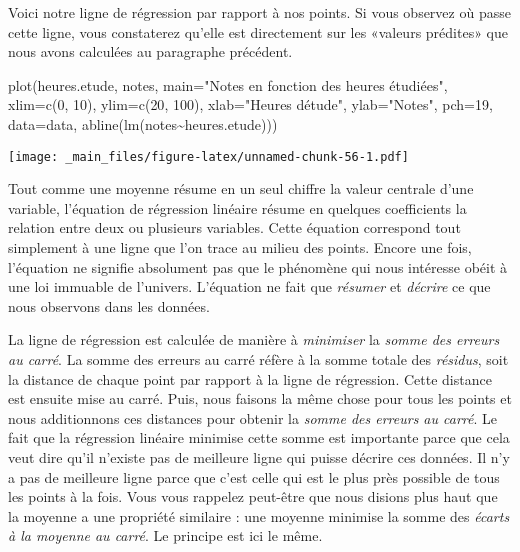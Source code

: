 \documentclass[
]{book}
\newenvironment{Shaded}{\begin{snugshade}}{\end{snugshade}}
\newcommand{\AttributeTok}[1]{\textcolor[rgb]{0.77,0.63,0.00}{#1}}
\newcommand{\DecValTok}[1]{\textcolor[rgb]{0.00,0.00,0.81}{#1}}
\newcommand{\FunctionTok}[1]{\textcolor[rgb]{0.00,0.00,0.00}{#1}}
\newcommand{\NormalTok}[1]{#1}
\newcommand{\SpecialCharTok}[1]{\textcolor[rgb]{0.00,0.00,0.00}{#1}}
\newcommand{\StringTok}[1]{\textcolor[rgb]{0.31,0.60,0.02}{#1}}
\begin{document}
Voici notre ligne de régression par rapport à nos points. Si vous observez où passe cette ligne, vous constaterez qu'elle est directement sur les «valeurs prédites» que nous avons calculées au paragraphe précédent.

\begin{Shaded}
\begin{Highlighting}[]
\FunctionTok{plot}\NormalTok{(heures.etude, notes, }\AttributeTok{main=}\StringTok{"Notes en fonction des heures étudiées"}\NormalTok{,}
     \AttributeTok{xlim=}\FunctionTok{c}\NormalTok{(}\DecValTok{0}\NormalTok{, }\DecValTok{10}\NormalTok{), }\AttributeTok{ylim=}\FunctionTok{c}\NormalTok{(}\DecValTok{20}\NormalTok{, }\DecValTok{100}\NormalTok{),}
    \AttributeTok{xlab=}\StringTok{"Heures d\textquotesingle{}étude"}\NormalTok{, }\AttributeTok{ylab=}\StringTok{"Notes"}\NormalTok{, }\AttributeTok{pch=}\DecValTok{19}\NormalTok{, }\AttributeTok{data=}\NormalTok{data,}
    \FunctionTok{abline}\NormalTok{(}\FunctionTok{lm}\NormalTok{(notes}\SpecialCharTok{\textasciitilde{}}\NormalTok{heures.etude)))}
\end{Highlighting}
\end{Shaded}

\texttt{[image: \_main\_files/figure-latex/unnamed-chunk-56-1.pdf]}

Tout comme une moyenne résume en un seul chiffre la valeur centrale d'une variable, l'équation de régression linéaire résume en quelques coefficients la relation entre deux ou plusieurs variables. Cette équation correspond tout simplement à une ligne que l'on trace au milieu des points. Encore une fois, l'équation ne signifie absolument pas que le phénomène qui nous intéresse obéit à une loi immuable de l'univers. L'équation ne fait que \emph{résumer} et \emph{décrire} ce que nous observons dans les données.

La ligne de régression est calculée de manière à \emph{minimiser} la \emph{somme des erreurs au carré}. La somme des erreurs au carré réfère à la somme totale des \emph{résidus}, soit la distance de chaque point par rapport à la ligne de régression. Cette distance est ensuite mise au carré. Puis, nous faisons la même chose pour tous les points et nous additionnons ces distances pour obtenir la \emph{somme des erreurs au carré}. Le fait que la régression linéaire minimise cette somme est importante parce que cela veut dire qu'il n'existe pas de meilleure ligne qui puisse décrire ces données. Il n'y a pas de meilleure ligne parce que c'est celle qui est le plus près possible de tous les points à la fois. Vous vous rappelez peut-être que nous disions plus haut que la moyenne a une propriété similaire : une moyenne minimise la somme des \emph{écarts à la moyenne au carré}. Le principe est ici le même.
\end{document}
